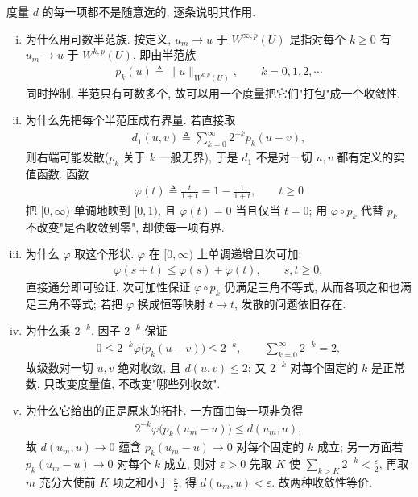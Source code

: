 \documentclass[../../main.tex]{subfiles}
\begin{document}
\begin{remark}
度量 $d$ 的每一项都不是随意选的, 逐条说明其作用.
\begin{enumerate}[(i)]
\item 为什么用可数半范族. 按定义, $u_{m}\to u$ 于 $W^{\infty,p}(U)$ 是指对每个 $k\geqslant0$ 有 $u_{m}\to u$ 于 $W^{k,p}(U)$, 即由半范族
\begin{align*}
p_{k}(u)\triangleq\lVert u\rVert_{W^{k,p}(U)},\qquad k=0,1,2,\cdots
\end{align*}
同时控制. 半范只有可数多个, 故可以用一个度量把它们"打包"成一个收敛性.

\item 为什么先把每个半范压成有界量. 若直接取
\begin{align*}
d_{1}(u,v)\triangleq\sum\limits_{k=0}^{\infty}2^{-k}p_{k}(u-v),
\end{align*}
则右端可能发散($p_{k}$ 关于 $k$ 一般无界), 于是 $d_{1}$ 不是对一切 $u,v$ 都有定义的实值函数. 函数
\begin{align*}
\varphi(t)\triangleq\frac{t}{1+t}=1-\frac{1}{1+t},\qquad t\geqslant0
\end{align*}
把 $[0,\infty)$ 单调地映到 $[0,1)$, 且 $\varphi(t)=0$ 当且仅当 $t=0$; 用 $\varphi\circ p_{k}$ 代替 $p_{k}$ 不改变"是否收敛到零", 却使每一项有界.

\item 为什么 $\varphi$ 取这个形状. $\varphi$ 在 $[0,\infty)$ 上单调递增且次可加:
\begin{align*}
\varphi(s+t)\leqslant\varphi(s)+\varphi(t),\qquad s,t\geqslant0,
\end{align*}
直接通分即可验证. 次可加性保证 $\varphi\circ p_{k}$ 仍满足三角不等式, 从而各项之和也满足三角不等式; 若把 $\varphi$ 换成恒等映射 $t\mapsto t$, 发散的问题依旧存在.

\item 为什么乘 $2^{-k}$. 因子 $2^{-k}$ 保证
\begin{align*}
0\leqslant 2^{-k}\varphi\bigl(p_{k}(u-v)\bigr)\leqslant 2^{-k},\qquad \sum\limits_{k=0}^{\infty}2^{-k}=2,
\end{align*}
故级数对一切 $u,v$ 绝对收敛, 且 $d(u,v)\leqslant2$; 又 $2^{-k}$ 对每个固定的 $k$ 是正常数, 只改变度量值, 不改变"哪些列收敛".

\item 为什么它给出的正是原来的拓扑. 一方面由每一项非负得
\begin{align*}
2^{-k}\varphi\bigl(p_{k}(u_{m}-u)\bigr)\leqslant d(u_{m},u),
\end{align*}
故 $d(u_{m},u)\to0$ 蕴含 $p_{k}(u_{m}-u)\to0$ 对每个固定的 $k$ 成立; 另一方面若 $p_{k}(u_{m}-u)\to0$ 对每个 $k$ 成立, 则对 $\varepsilon>0$ 先取 $K$ 使 $\sum\limits_{k>K}2^{-k}<\frac{\varepsilon}{2}$, 再取 $m$ 充分大使前 $K$ 项之和小于 $\frac{\varepsilon}{2}$, 得 $d(u_{m},u)<\varepsilon$. 故两种收敛性等价.


\end{enumerate}
\end{remark}
\end{document}
